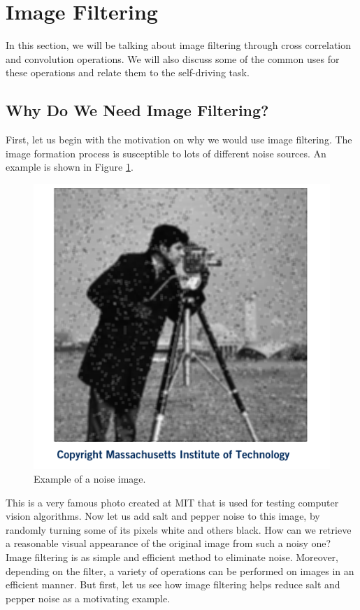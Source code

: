 \section{Image Filtering}
\label{image_filtering}

In this section, we will 
be talking about image filtering through cross correlation and
convolution operations. We will also discuss some of the common uses for these operations and relate them to the self-driving task. 

\subsection{Why Do We Need Image Filtering?}
First, let us begin with the motivation on why we
would use image filtering. The image formation process is susceptible to lots of
different noise sources. An example is shown in Figure \ref{camera_man_1}.

\begin{figure}[!htb]
\begin{center}
\includegraphics[scale=0.380]{img/visual_perception/camera_man_1.jpeg}
\end{center}
\caption{Example of a noise image.}
\label{camera_man_1}
\end{figure}

This is a very famous photo created at MIT that is used for testing
computer vision algorithms. Now let us add salt and
pepper noise to this image, by randomly turning some of its pixels white
and others black. How can we retrieve a reasonable visual appearance of the original image
from such a noisy one? Image filtering is as simple and efficient method
to eliminate noise. Moreover, depending on the filter, a variety of operations can be performed on images in
an efficient manner. But first, let us see how image filtering helps reduce salt and pepper noise as
a motivating example. 

